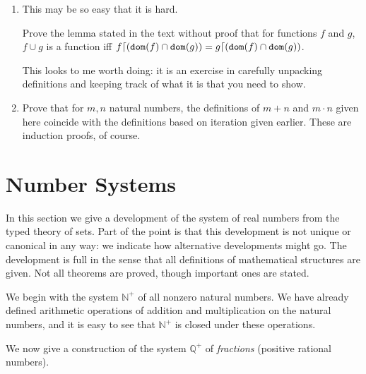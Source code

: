 \documentclass[12pt]{book}
\begin{document}
\begin{enumerate}
\item This may be so easy that it is hard.

Prove the lemma stated in the text without proof that for functions $f$ and $g$, $f \cup g$ is a function iff $f \lceil ({\tt dom}(f) \cap {\tt dom}(g)) = g \lceil ({\tt dom}(f) \cap {\tt dom}(g))$.

This looks to me worth doing:  it is an exercise in carefully unpacking definitions and keeping track of what it is that you need to show.

\item Prove that for $m,n$ natural numbers, the definitions of $m+n$ and $m \cdot n$ given here coincide with the definitions based on iteration given earlier.  These are induction proofs, of course.


\end{enumerate}

\newpage

\section{Number Systems}

In this section we give a development of the system of real numbers
from the typed theory of sets.  Part of the point is that this
development is not unique or canonical in any way: we indicate how
alternative developments might go.  The development is full in the
sense that all definitions of mathematical structures are given.  Not
all theorems are proved, though important ones are stated.

We begin with the system ${\mathbb N}^+$ of all nonzero natural
numbers.  We have already defined arithmetic operations of addition
and multiplication on the natural numbers, and it is easy to see that
${\mathbb N}^+$ is closed under these operations.

We now give a construction of the system ${\mathbb Q}^+$ of {\em
fractions\/} (positive rational numbers).  
\end{document}
